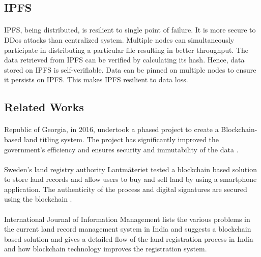 \documentclass{article}
\begin{document}
    \subsection{IPFS}
        \paragraph{}
        IPFS, being distributed, is resilient to single point of failure. It is more secure to DDos attacks than centralized system. Multiple nodes can simultaneously participate in distributing a particular file resulting in better throughput. The data retrieved from IPFS can be verified by calculating its hash. Hence, data stored on IPFS is self-verifiable. Data can be pinned on multiple nodes to ensure it persists on IPFS. This makes IPFS resilient to data loss.

    \subsection{Related Works}
        \paragraph{}
        Republic of Georgia, in 2016, undertook a phased project to create a Blockchain-based land titling system. The project has significantly improved the government’s efficiency and ensures security and immutability of the data \cite{10.1162/inov_a_00276}.

        \paragraph{}
        Sweden’s land registry authority Lantmäteriet tested a blockchain based solution to store land records and allow users to buy and sell land by using a smartphone application. The authenticity of the process and digital signatures are secured using the blockchain \cite{sweden}.
        
        \paragraph{}
        International Journal of Information Management \cite{THAKUR2020101940} lists the various problems in the current land record management system in India and suggests a blockchain based solution and gives a detailed flow of the land registration process in India and how blockchain technology improves the registration system.
\end{document}
